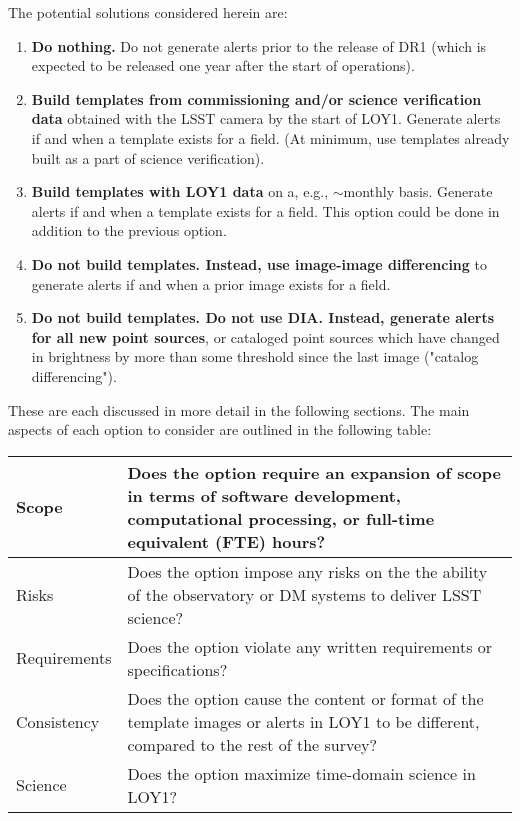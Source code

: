 \documentclass[DM,toc]{lsstdoc}
\begin{document}
The potential solutions considered herein are:
\begin{enumerate}
\item {\bf Do nothing.} Do not generate alerts prior to the release of DR1 (which is expected to be released one year after the start of operations).
\item {\bf Build templates from commissioning and/or science verification data} obtained with the LSST camera by the start of LOY1. Generate alerts if and when a template exists for a field. (At minimum, use templates already built as a part of science verification).
\item {\bf Build templates with LOY1 data} on a, e.g., $\sim$monthly basis. Generate alerts if and when a template exists for a field. This option could be done in addition to the previous option.
\item {\bf Do not build templates. Instead, use image-image differencing} to generate alerts if and when a prior image exists for a field.
\item {\bf Do not build templates. Do not use DIA. Instead, generate alerts for all new point sources}, or cataloged point sources which have changed in brightness by more than some threshold since the last image ("catalog differencing").
\end{enumerate}

These are each discussed in more detail in the following sections.
The main aspects of each option to consider are outlined in the following table:
\begin{center}
\begin{tabular}{|p{2.5cm}|p{13cm}|}
\hline
Scope & Does the option require an expansion of scope in terms of software development, computational processing, or full-time equivalent (FTE) hours? \\
\hline
Risks & Does the option impose any risks on the the ability of the observatory or DM systems to deliver LSST science?  \\
\hline
Requirements & Does the option violate any written requirements or specifications? \\
\hline
Consistency & Does the option cause the content or format of the template images or alerts in LOY1 to be different, compared to the rest of the survey? \\ 
\hline
Science & Does the option maximize time-domain science in LOY1? \\
\hline
\end{tabular}
\end{center} 
\end{document}
